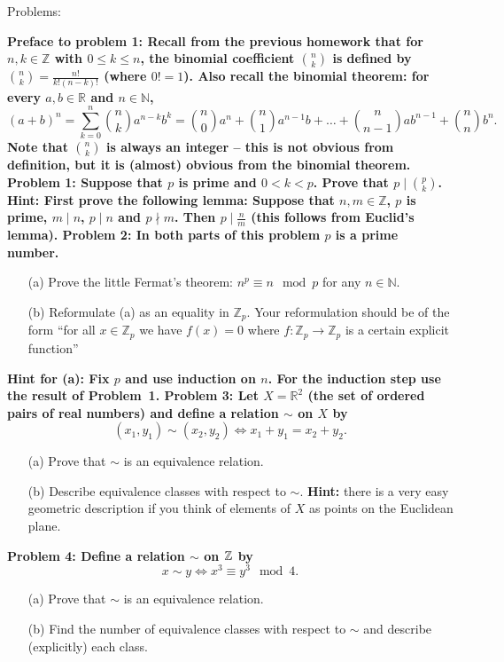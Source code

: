 \documentclass[11pt]{amsart}
\begin{document}
\skv
\bf\centerline{Problems: }\rm
\skv
\bf{Preface to problem 1: }\rm
Recall from the previous homework that for 
$n,k\in\mathbb Z$ with $0\leq k\leq n$, the binomial coefficient
$n\choose k$ is defined by ${n\choose k}=\frac{n!}{k!(n-k)!}$
(where $0!=1$). Also recall the binomial theorem:
for every $a,b\in\mathbb R$
and $n\in\mathbb N$,
$$(a+b)^n=\sum_{k=0}^n {n\choose k} a^{n-k} b^{k}=
{n\choose 0} a^n +{n\choose 1} a^{n-1}b+\ldots+{n\choose {n-1}} a b^{n-1}+{n\choose n} b^n.$$
Note that $n\choose k$ is always an integer -- this is not obvious from definition,
but it is (almost) obvious from the binomial theorem.
\skv
\bf{Problem 1: }\rm Suppose that $p$ is prime and $0<k<p$. Prove that
$p\mid {p\choose k}$. \bf{Hint: }\rm First prove the following lemma:
Suppose that $n,m\in\mathbb Z$, $p$ is prime, $m\mid n$, $p\mid n$ and
$p\nmid m$. Then $p\mid \frac{n}{m}$ (this follows from Euclid's lemma). 
\skv
\bf{Problem 2: }\rm In both parts of this problem $p$ is a prime number.
\begin{itemize}
\item[(a)] Prove the little Fermat's theorem: $n^p\equiv n\mod p$ for any $n\in\mathbb N$.
\item[(b)] Reformulate (a) as an equality in $\mathbb Z_p$. Your reformulation should be of the form
``for all $x\in\mathbb Z_p$ we have $f(x)=0$ where $f:\mathbb Z_p\to\mathbb Z_p$ is a certain explicit function''
 \end{itemize}
\bf{Hint for (a): }\rm Fix $p$ and use induction on $n$. For the  induction
step use the result of Problem~1.
\skv
\bf{Problem 3: }\rm Let $X=\mathbb R^2$ (the set of ordered pairs of real numbers) and define a relation $\sim$ on $X$ by
$$(x_1,y_1)\sim (x_2,y_2)\iff x_1+y_1=x_2+y_2.$$
\begin{itemize}
\item[(a)] Prove that $\sim$ is an equivalence relation. 
\item[(b)] Describe equivalence classes with respect to $\sim$. {\bf Hint:} there is a very easy geometric description if you think of elements of $X$ as points on the Euclidean plane.
\end{itemize}
 \skv
\bf{Problem 4: }\rm Define a relation $\sim$ on ${\mathbb Z}$ by
$$x\sim y\iff x^3\equiv y^3\mod 4.$$
\begin{itemize}
\item[(a)] Prove that $\sim$ is an equivalence relation. 
\item[(b)] Find the number of equivalence classes with respect to $\sim$ and describe (explicitly) each class.
\end{itemize}
\end{document}
